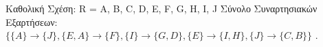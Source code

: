 Καθολική Σχέση: R = {\foreignlanguage{english}{A, B, C, D, E, F, G, H, I, J}} 
\hfill \break
Σύνολο Συναρτησιακών Εξαρτήσεων: {\foreignlanguage{english}{$\{\{A\} \rightarrow \{J\}, \{E, A\} \rightarrow \{F\}, \{I\} \rightarrow \{G, D\}, \{E\} \rightarrow \{I, H\}, \{J\} \rightarrow \{C, B\}\}$ }}
\hfill {}. 


